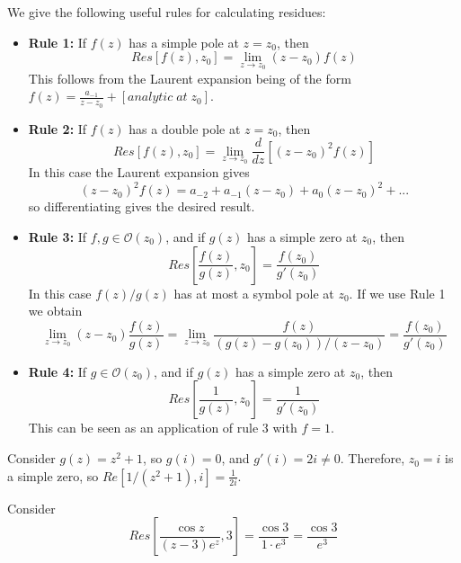 \begin{remark}
    We give the following useful rules for calculating residues:\begin{itemize}
        \item \textbf{Rule 1:} If $f(z)$ has a simple pole at $z = z_0$, then $$Res[f(z),z_0] = \lim\limits_{z\rightarrow z_0}(z-z_0)f(z)$$
            This follows from the Laurent expansion being of the form $f(z) = \frac{a_{-1}}{z-z_0}+[analytic\;at\;z_0]$.
        \item \textbf{Rule 2:} If $f(z)$ has a double pole at $z = z_0$, then $$Res[f(z),z_0] = \lim\limits_{z\rightarrow z_0}\frac{d}{dz}[(z-z_0)^2f(z)]$$
            In this case the Laurent expansion gives \begin{equation*}
                (z-z_0)^2f(z) = a_{-2}+a_{-1}(z-z_0)+a_0(z-z_0)^2+...
            \end{equation*}
            so differentiating gives the desired result.
        \item \textbf{Rule 3:} If $f,g \in \mathcal{O}(z_0)$, and if $g(z)$ has a simple zero at $z_0$, then $$Res\left[\frac{f(z)}{g(z)},z_0\right] = \frac{f(z_0)}{g'(z_0)}$$ In this case $f(z)/g(z)$ has at most a symbol pole at $z_0$. If we use Rule 1 we obtain \begin{equation*}
                \lim\limits_{z\rightarrow z_0}(z-z_0)\frac{f(z)}{g(z)} = \lim\limits_{z\rightarrow z_0}\frac{f(z)}{(g(z)-g(z_0))/(z-z_0)} = \frac{f(z_0)}{g'(z_0)}
        \end{equation*}
        \item \textbf{Rule 4:} If $g \in \mathcal{O}(z_0)$, and if $g(z)$ has a simple zero at $z_0$, then $$Res\left[\frac{1}{g(z)},z_0\right] = \frac{1}{g'(z_0)}$$ This can be seen as an application of rule $3$ with $f = 1$.
    \end{itemize}
\end{remark}


\begin{example}
    Consider $g(z) = z^2+1$, so $g(i) = 0$, and $g'(i) = 2i \neq 0$. Therefore, $z_0 = i$ is a simple zero, so $Re[1/(z^2+1),i] = \frac{1}{2i}$.
\end{example}

\begin{example}
    Consider \begin{equation*}
        Res\left[\frac{\cos z}{(z-3)e^z},3\right] = \frac{\cos 3}{1\cdot e^3} = \frac{\cos 3}{e^3}
    \end{equation*}
\end{example}


